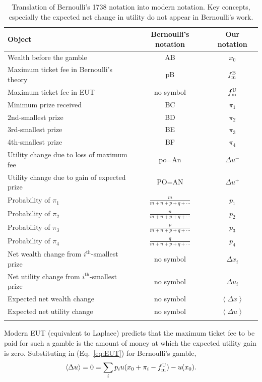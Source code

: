 \documentclass[pdftex]{article}
\newcommand{\ave}[1]{\left\langle#1 \right\rangle}
\newcommand{\elabel}[1]{\label{eq:#1}}
\newcommand{\eref}[1]{(Eq.~\ref{eq:#1})}
\newcommand{\tlabel}[1]{\label{tab:#1}}
\newcommand{\be}{\begin{equation}}
\newcommand{\ee}{\end{equation}}
\newcommand{\Dx}{{\Delta x}}
\newcommand{\Du}{\Delta u}
\newcommand{\tml}{{f_{\text{\normalfont{m}}}^{\text{\normalfont{U}}}}}
\newcommand{\tmb}{{f_{\text{\normalfont{m}}}^{\text{\normalfont{B}}}}}
\begin{document}
\begin{center}
\begin{table}
  \begin{tabular}{ l | c | c }
    \hline
    Object & Bernoulli's notation & Our notation \\ \hline
    Wealth before the gamble & AB & $x_0$ \\
    Maximum ticket fee in Bernoulli's theory & pB & $\tmb$ \\
    Maximum ticket fee in EUT & no symbol & $\tml$ \\
    Minimum prize received & BC & $\pi_1$\\
    2nd-smallest prize & BD & $\pi_2$\\
    3rd-smallest prize & BE & $\pi_3$\\
    4th-smallest prize & BF & $\pi_4$\\
    Utility change due to loss of maximum fee & po=An &$\Du^{-}$\\
    Utility change due to gain of expected prize & PO=AN&$\Du^+$\\
Probability of $\pi_1$ &$\frac{m}{m+n+p+q+\cdots}$&$p_1$\\
Probability of $\pi_2$ &$\frac{n}{m+n+p+q+\cdots}$&$p_2$\\
Probability of $\pi_3$ &$\frac{p}{m+n+p+q+\cdots}$&$p_3$\\
Probability of $\pi_4$ &$\frac{q}{m+n+p+q+\cdots}$&$p_4$\\
Net wealth change from $i^{\text{th}}$-smallest prize & no symbol & $\Dx_i$\\
Net utility change from $i^{\text{th}}$-smallest prize & no symbol & $\Du_i$\\
Expected net wealth change & no symbol & $\ave{\Dx}$\\
Expected net utility change & no symbol & $\ave{\Du}$\\
    \hline
    \tlabel{key}
  \end{tabular}
\caption{Translation of Bernoulli's 1738 notation into modern notation. Key concepts, especially the expected net change in utility do not appear in Bernoulli's work.}
\end{table}
\end{center}

Modern EUT (equivalent to Laplace) predicts that the maximum ticket fee to be paid for such a gamble is the amount of money at which the expected utility gain is zero. Substituting in \eref{EUT} for Bernoulli's gamble,
\be
\ave{\Du}=0=\sum_i p_i u(x_0+\pi_i-\tml) - u(x_0).
\elabel{EUT_B}
\ee
\end{document}
